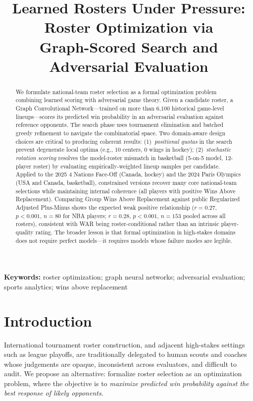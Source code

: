 \documentclass[12pt,letterpaper]{article}
\title{Learned Rosters Under Pressure: Roster Optimization via\\
  Graph-Scored Search and Adversarial Evaluation}
\date{}
\begin{document}
\maketitle

\begin{abstract}
We formulate national-team roster selection as a formal optimization
problem combining learned scoring with adversarial game theory.
Given a candidate roster, a Graph Convolutional Network---trained on
more than 6{,}100 historical game-level lineups---scores its predicted
win probability in an adversarial evaluation against reference opponents.
The search phase uses tournament elimination and batched greedy refinement
to navigate the combinatorial space.
Two domain-aware design choices are critical to producing coherent results:
(1)~\emph{positional quotas} in the search prevent degenerate local
optima (e.g., 10 centers, 0 wings in hockey); (2)~\emph{stochastic
rotation scoring} resolves the model-roster mismatch in basketball
(5-on-5 model, 12-player roster) by evaluating empirically-weighted
lineup samples per candidate.
Applied to the 2025 4 Nations Face-Off (Canada, hockey) and the 2024
Paris Olympics (USA and Canada, basketball), constrained versions recover
many core national-team selections while maintaining internal coherence
(all players with positive Wins Above Replacement).
Comparing Group Wins Above Replacement against public Regularized
Adjusted Plus-Minus shows the expected weak positive relationship
($r = 0.27$, $p < 0.001$, $n = 80$ for NBA players; $r = 0.28$,
$p < 0.001$, $n = 153$ pooled across all rosters), consistent with
WAR being roster-conditional rather than an intrinsic player-quality
rating.
The broader lesson is that formal optimization in high-stakes domains
does not require perfect models---it requires models whose failure
modes are legible.
\end{abstract}

\smallskip
\noindent\textbf{Keywords:} roster optimization; graph neural networks;
adversarial evaluation; sports analytics; wins above replacement

\section{Introduction}

International tournament roster construction, and adjacent high-stakes
settings such as league playoffs, are traditionally delegated to human
scouts and coaches whose judgements are opaque, inconsistent across
evaluators, and difficult to audit.
We propose an alternative: formalize roster selection as an optimization
problem, where the objective is to
\emph{maximize predicted win probability against the best response of
likely opponents}.
\end{document}
